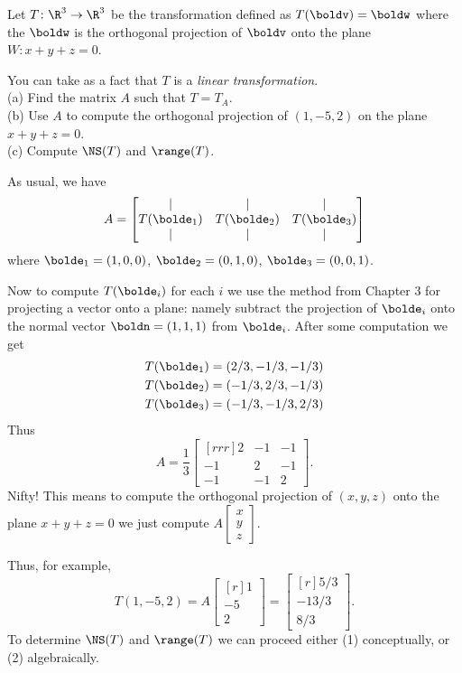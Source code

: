 \ii Let $T\colon \R^3\rightarrow \R^3$ be the transformation defined as $T(\boldv)=\boldw$ where the $\boldw$ is the orthogonal projection of $\boldv$ onto the plane $W\colon x+y+z=0$. 

You can take as a fact that $T$ is a {\em linear transformation}.
\\ 
(a) Find the matrix $A$ such that $T=T_A$. 
\\
(b) Use $A$ to compute the orthogonal projection of $(1,-5,2)$ on the plane $x+y+z=0$. 
\\
(c) Compute $\NS(T)$ and $\range(T)$. 
\\
\begin{solution}
As usual, we have 
\[
A=\begin{bmatrix}
\vert &\vert&\vert \\
T(\bolde_1) &T(\bolde_2)&T(\bolde_3)\\
\vert &\vert &\vert
\end{bmatrix}
\]
where $\bolde_1=(1,0,0)$, $\bolde_2=(0,1,0)$, $\bolde_3=(0,0,1)$. 

Now to compute $T(\bolde_i)$ for each $i$ we use the method from Chapter 3 for projecting a vector onto a plane: namely subtract the projection of $\bolde_i$ onto the normal vector $\boldn=(1,1,1)$ from $\bolde_i$. After some computation we get 
\begin{align*}
T(\bolde_1)&=(2/3,-1/3,-1/3)\\
T(\bolde_2)&=(-1/3,2/3,-1/3)\\
T(\bolde_3)&=(-1/3,-1/3,2/3)
\end{align*}
Thus 
\[ A=\frac{1}{3}\begin{bmatrix}[rrr]
2&-1&-1\\
-1&2&-1\\
-1&-1&2
\end{bmatrix}
.
\]
Nifty! This means to compute the orthogonal projection of $(x,y,z)$ onto the plane $x+y+z=0$ we just compute $A\begin{bmatrix}
x\\ y\\ z
\end{bmatrix}$.

Thus, for example, \[
T(1,-5,2)=A\begin{bmatrix}[r]
1\\ -5 \\ 2
\end{bmatrix}=\begin{bmatrix}[r]
5/3\\ -13/3 \\ 8/3
\end{bmatrix}.
\]
To determine $\NS(T)$ and $\range(T)$ we can proceed either (1) conceptually, or (2) algebraically. 


\end{solution}
